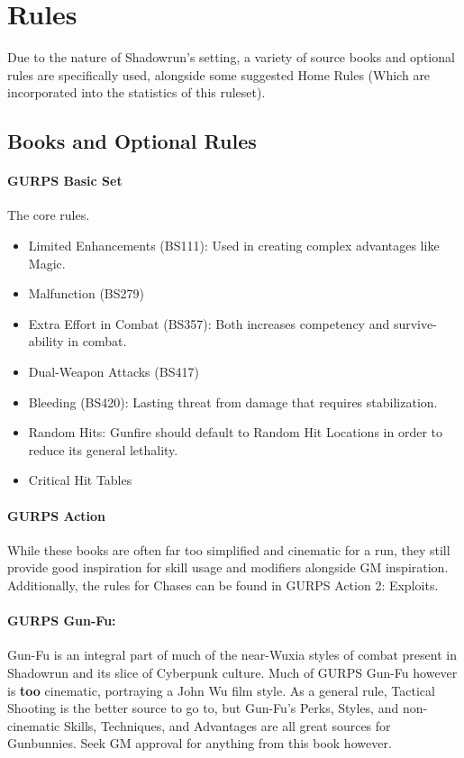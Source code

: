 \section{Rules}

\begin{multicols*}{3}
	
	Due to the nature of Shadowrun's setting, a variety of source books and optional rules are specifically used, alongside some suggested Home Rules (Which are incorporated into the statistics of this ruleset).
	
	\subsection{Books and Optional Rules}
	
	\paragraph{GURPS Basic Set}
	The core rules.
	\begin{itemize}
		\itemsep0em 
		\item Limited Enhancements (BS111): Used in creating complex advantages like Magic.
		\item Malfunction (BS279)
		\item Extra Effort in Combat (BS357): Both increases competency and survive-ability in combat.
		\item Dual-Weapon Attacks (BS417)
		\item Bleeding (BS420): Lasting threat from damage that requires stabilization.
		\item Random Hits: Gunfire should default to Random Hit Locations in order to reduce its general lethality.
		\item Critical Hit Tables
	\end{itemize}

	\paragraph{GURPS Action}
	While these books are often far too simplified and cinematic for a run, they still provide good inspiration for skill usage and modifiers alongside GM inspiration. Additionally, the rules for Chases can be found in GURPS Action 2: Exploits.
	
	\paragraph{GURPS Gun-Fu:}
	Gun-Fu is an integral part of much of the near-Wuxia styles of combat present in Shadowrun and its slice of Cyberpunk culture. Much of GURPS Gun-Fu however is \textbf{too} cinematic, portraying a John Wu film style. As a general rule, Tactical Shooting is the better source to go to, but Gun-Fu's Perks, Styles, and non-cinematic Skills, Techniques, and Advantages are all great sources for Gunbunnies. Seek GM approval for anything from this book however.
	

\end{multicols*}
